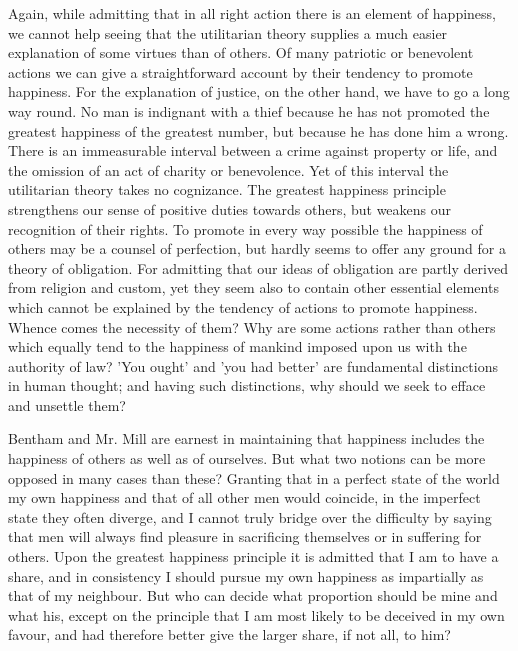 \documentclass[11pt,letter]{article}
\begin{document}
\par  Again, while admitting that in all right action there is an element of happiness, we cannot help seeing that the utilitarian theory supplies a much easier explanation of some virtues than of others. Of many patriotic or benevolent actions we can give a straightforward account by their tendency to promote happiness. For the explanation of justice, on the other hand, we have to go a long way round. No man is indignant with a thief because he has not promoted the greatest happiness of the greatest number, but because he has done him a wrong. There is an immeasurable interval between a crime against property or life, and the omission of an act of charity or benevolence. Yet of this interval the utilitarian theory takes no cognizance. The greatest happiness principle strengthens our sense of positive duties towards others, but weakens our recognition of their rights. To promote in every way possible the happiness of others may be a counsel of perfection, but hardly seems to offer any ground for a theory of obligation. For admitting that our ideas of obligation are partly derived from religion and custom, yet they seem also to contain other essential elements which cannot be explained by the tendency of actions to promote happiness. Whence comes the necessity of them? Why are some actions rather than others which equally tend to the happiness of mankind imposed upon us with the authority of law? 'You ought' and 'you had better' are fundamental distinctions in human thought; and having such distinctions, why should we seek to efface and unsettle them?

\par  Bentham and Mr. Mill are earnest in maintaining that happiness includes the happiness of others as well as of ourselves. But what two notions can be more opposed in many cases than these? Granting that in a perfect state of the world my own happiness and that of all other men would coincide, in the imperfect state they often diverge, and I cannot truly bridge over the difficulty by saying that men will always find pleasure in sacrificing themselves or in suffering for others. Upon the greatest happiness principle it is admitted that I am to have a share, and in consistency I should pursue my own happiness as impartially as that of my neighbour. But who can decide what proportion should be mine and what his, except on the principle that I am most likely to be deceived in my own favour, and had therefore better give the larger share, if not all, to him?
\end{document}
